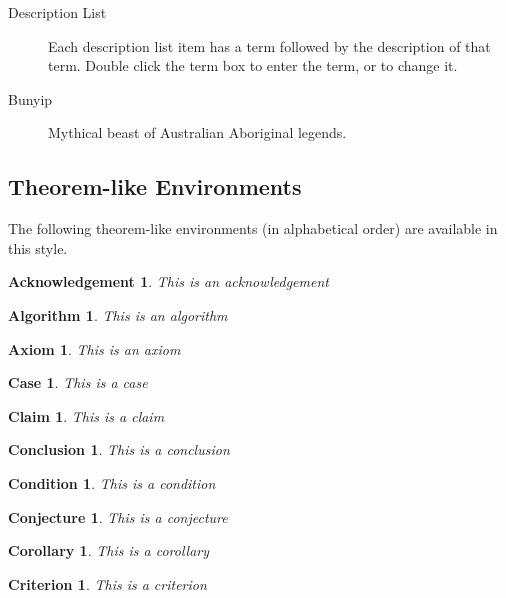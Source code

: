 \documentclass{article}%
\newtheorem{acknowledgement}[theorem]{Acknowledgement}
\newtheorem{algorithm}[theorem]{Algorithm}
\newtheorem{axiom}[theorem]{Axiom}
\newtheorem{case}[theorem]{Case}
\newtheorem{claim}[theorem]{Claim}
\newtheorem{conclusion}[theorem]{Conclusion}
\newtheorem{condition}[theorem]{Condition}
\newtheorem{conjecture}[theorem]{Conjecture}
\newtheorem{corollary}[theorem]{Corollary}
\newtheorem{criterion}[theorem]{Criterion}
\begin{document}
\begin{description}
\item[Description List] Each description list item has a term followed by the
description of that term. Double click the term box to enter the term, or to
change it.

\item[Bunyip] Mythical beast of Australian Aboriginal legends.
\end{description}

\subsection{Theorem-like Environments}

The following theorem-like environments (in alphabetical order) are available
in this style.

\begin{acknowledgement}
This is an acknowledgement
\end{acknowledgement}

\begin{algorithm}
This is an algorithm
\end{algorithm}

\begin{axiom}
This is an axiom
\end{axiom}

\begin{case}
This is a case
\end{case}

\begin{claim}
This is a claim
\end{claim}

\begin{conclusion}
This is a conclusion
\end{conclusion}

\begin{condition}
This is a condition
\end{condition}

\begin{conjecture}
This is a conjecture
\end{conjecture}

\begin{corollary}
This is a corollary
\end{corollary}

\begin{criterion}
This is a criterion
\end{criterion}
\end{document}
